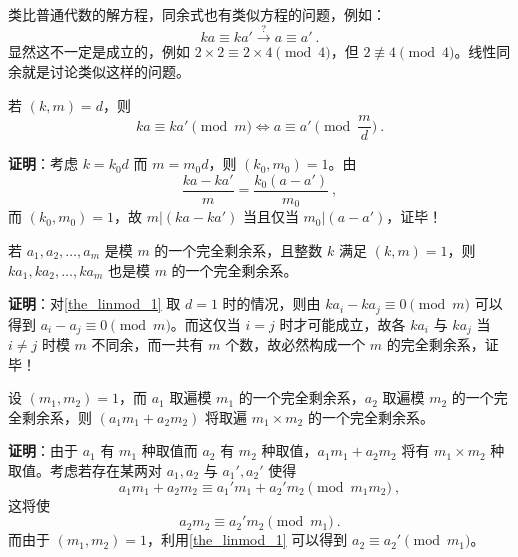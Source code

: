 

类比普通代数的解方程，同余式也有类似方程的问题，例如：
\begin{equation}
ka \equiv ka' \xrightarrow{?} a \equiv a'  ~.
\end{equation}
显然这不一定是成立的，例如 $2 \times 2 \equiv 2 \times 4 \pmod 4$，但 $2 \not \equiv 4 \pmod 4$。线性同余就是讨论类似这样的问题。

\begin{theorem}{}\label{the_linmod_1}
若 $(k, m) = d$，则
\begin{equation}
ka \equiv ka' \pmod m \Leftrightarrow a \equiv a' \pmod{\frac{m}{d}} ~.
\end{equation}
\end{theorem}
\textbf{证明}：考虑 $k = k_0 d$ 而 $m = m_0 d$，则 $(k_0, m_0) = 1$。由
\begin{equation}
\frac{ka - ka'}{m} = \frac{k_0(a - a')}{m_0} ~,
\end{equation}
而 $(k_0, m_0) = 1$，故 $m | (k a - k a')$ 当且仅当 $m_0 | (a - a')$，证毕！

\begin{theorem}{}\label{the_linmod_2}
若 $a_1, a_2, \dots, a_m$ 是模 $m$ 的一个完全剩余系，且整数 $k$ 满足 $(k, m) =1$，则 $ka_1, ka_2, \dots, ka_m$ 也是模 $m$ 的一个完全剩余系。
\end{theorem}
\textbf{证明}：对\autoref{the_linmod_1} 取 $d=1$ 时的情况，则由 $ka_i - ka_j \equiv 0 \pmod m$ 可以得到 $a_i - a_j \equiv 0 \pmod m$。而这仅当 $i = j$ 时才可能成立，故各 $ka_i$ 与 $ka_j$ 当 $i \neq j$ 时模 $m$ 不同余，而一共有 $m$ 个数，故必然构成一个 $m$ 的完全剩余系，证毕！

\begin{theorem}{}
设 $(m_1, m_2) = 1$，而 $a_1$ 取遍模 $m_1$ 的一个完全剩余系，$a_2$ 取遍模 $m_2$ 的一个完全剩余系，则 $(a_1 m_1 + a_2 m_2)$ 将取遍 $m_1 \times m_2$ 的一个完全剩余系。
\end{theorem}
\textbf{证明}：由于 $a_1$ 有 $m_1$ 种取值而 $a_2$ 有 $m_2$ 种取值，$a_1m_1+a_2m_2$ 将有 $m_1 \times m_2$ 种取值。考虑若存在某两对 $a_1, a_2$ 与 $a_1', a_2'$ 使得
\begin{equation}
a_1 m_1 + a_2 m_2 \equiv a_1' m_1 + a_2' m_2 \pmod{m_1 m_2} ~,
\end{equation}
这将使
\begin{equation}
a_2 m_2 \equiv a_2' m_2 \pmod{m_1} ~.
\end{equation}
而由于 $(m_1, m_2) = 1$，利用\autoref{the_linmod_1} 可以得到 $a_2 \equiv a_2' \pmod{m_1}$。

